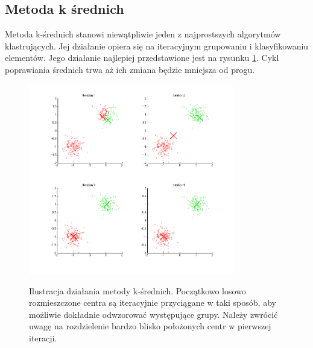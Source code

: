 \documentclass[12pt,a4paper,oneside]{report} %
\begin{document}
\subsection{Metoda k średnich}

Metoda k-średnich stanowi niewątpliwie jeden z najprostszych algorytmów klastrujących. Jej działanie opiera się na iteracyjnym grupowaniu i klasyfikowaniu elementów. Jego działanie najlepiej przedstawione jest na rysunku \ref{kmeanspng}. Cykl poprawiania średnich trwa aż ich zmiana będzie mniejsza od progu.\par

\begin{figure}
\centering
\includegraphics[width=0.8\textwidth]{kmeans.png}
\label{kmeanspng}
\caption[Ilustracja działania metody k-średnich]{Ilustracja działania metody k-średnich. Początkowo losowo rozmieszczone centra są iteracyjnie przyciągane w taki sposób, aby możliwie dokładnie odwzorować występujące grupy. Należy zwrócić uwagę na rozdzielenie bardzo blisko położonych centr w pierwszej iteracji.}
\end{figure}
\end{document}
